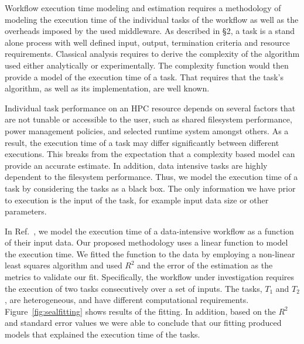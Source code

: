 Workflow execution time modeling and estimation requires a methodology of 
modeling the execution time of the individual tasks of the workflow as well as 
the overheads imposed by the used middleware. As described in \S2, a task is a 
stand alone process with well defined input, output, termination criteria and 
resource requirements. Classical analysis requires to derive the complexity of 
the algorithm used either analytically or experimentally. The complexity 
function would then provide a model of the execution time of a task. That 
requires that the task's algorithm, as well as its implementation, are well 
known. 

Individual task performance on an HPC resource depends on several factors that 
are not tunable or accessible to the user, such as shared filesystem 
performance, power management policies, and selected runtime system amongst 
others. As a result, the execution time of a task may differ significantly 
between different executions. This breaks from the expectation that a complexity 
based model can provide an accurate estimate. In addition, data intensive tasks 
are highly dependent to the filesystem performance. Thus, we model the 
execution time of a task by considering the tasks as a black box. The only 
information we have prior to execution is the input of the task, for example 
input data size or other parameters.

In Ref.~\cite{paraskevakos2019workflow}, we model the execution time of a 
data-intensive workflow as a function of their input data. Our proposed 
methodology uses a linear function to model the execution time. We fitted the 
function to the data by employing a non-linear least squares algorithm and used 
$R^{2}$ and the error of the estimation as the metrics to validate our fit. 
Specifically, the workflow under investigation requires the execution of two 
tasks consecutively over a set of inputs. The tasks, $T_{1}$ and $T_{2}$, are 
heterogeneous, and have different computational requirements. 
Figure~\ref{fig:sealfitting} shows results of the fitting. In addition, based 
on the $R^{2}$ and standard error values we were able to conclude that our 
fitting produced models that explained the execution time of the tasks.

